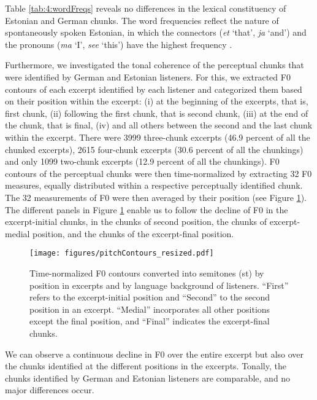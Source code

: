 \documentclass[output=paper]{langscibook}
\begin{document}
    
    Table \ref{tab:4:wordFreqs} reveals no differences in the lexical constituency of Estonian and German chunks. The word frequencies reflect the nature of spontaneously spoken Estonian, in which the connectors (\textit{et} ‘that', \textit{ja} ‘and') and the pronouns (\textit{ma} ‘I', \textit{see} ‘this') have the highest frequency \citep[see][]{lippus2019}.

    Furthermore, we investigated the tonal coherence of the perceptual chunks that were identified by German and Estonian listeners. For this, we extracted F0 contours of each excerpt identified by each listener and categorized them based on their position within the excerpt: (i) at the beginning of the excerpts, that is, first chunk, (ii) following the first chunk, that is second chunk, (iii) at the end of the chunk, that is final, (iv) and all others between the second and the last chunk within the excerpt. There were 3999 three-chunk excerpts (46.9 percent of all the chunked excerpts), 2615 four-chunk excerpts (30.6 percent of all the chunkings) and only 1099 two-chunk excerpts (12.9 percent of all the chunkings). F0 contours of the perceptual chunks were then time-normalized by extracting 32 F0 measures, equally distributed within a respective perceptually identified chunk. The 32 measurements of F0 were then averaged by their position (see Figure \ref{fig:2:contours}). The different panels in Figure \ref{fig:2:contours} enable us to follow the decline of F0 in the excerpt-initial chunks, in the chunks of second position, the chunks of excerpt-medial position, and the chunks of the excerpt-final position.

    \begin{figure}%
		\centering\texttt{[image: figures/pitchContours\_resized.pdf]}\\
	    \caption{Time-normalized F0 contours converted into semitones (st) by position in excerpts and by language background of listeners. “First” refers to the excerpt-initial position and “Second” to the second position in an excerpt. “Medial” incorporates all other positions except the final position, and “Final” indicates the excerpt-final chunks.
	    }
	    \label{fig:2:contours}
    \end{figure}

    We can observe a continuous decline in F0 over the entire excerpt but also over the chunks identified at the different positions in the excerpts. Tonally, the chunks identified by German and Estonian listeners are comparable, and no major differences occur.%
    
\end{document}
